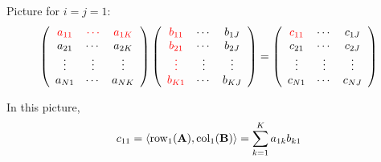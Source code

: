 \begin{frame}
    
    \vspace{2em}
    Picture for $i=j=1$:
    \small\begin{equation*}
        \left(
        \begin{array}{ccc}
            \textcolor{red}{a_{11}} & \textcolor{red}{\cdots} & \textcolor{red}{a_{1K}} \\
            a_{21} & \cdots & a_{2K} \\
            \vdots & \vdots & \vdots \\
            a_{N1} & \cdots & a_{NK} \\
        \end{array}
        \right)
        \left(
        \begin{array}{ccc}
            \textcolor{red}{b_{11}} & \cdots & b_{1J} \\
            \textcolor{red}{b_{21}} & \cdots & b_{2J} \\
            \textcolor{red}{\vdots} & \vdots & \vdots \\
            \textcolor{red}{b_{K1}} & \cdots & b_{KJ} \\
        \end{array}
        \right)
        =
        \left(
        \begin{array}{ccc}
            \textcolor{red}{c_{11}} & \cdots & c_{1J} \\
            c_{21} & \cdots & c_{2J} \\
            \vdots & \vdots & \vdots \\
            c_{N1} & \cdots & c_{NJ} \\
        \end{array}
        \right)
    \end{equation*}
    
    \vspace{1em}
    In this picture, 
    \begin{equation*}
        c_{11} = \left\langle{\operatorname{row}_1(\mathbf A) , \operatorname{col}_1 (\mathbf B)}\right\rangle = \sum_{k=1}^K a_{1k} b_{k1}
    \end{equation*}

\end{frame}


